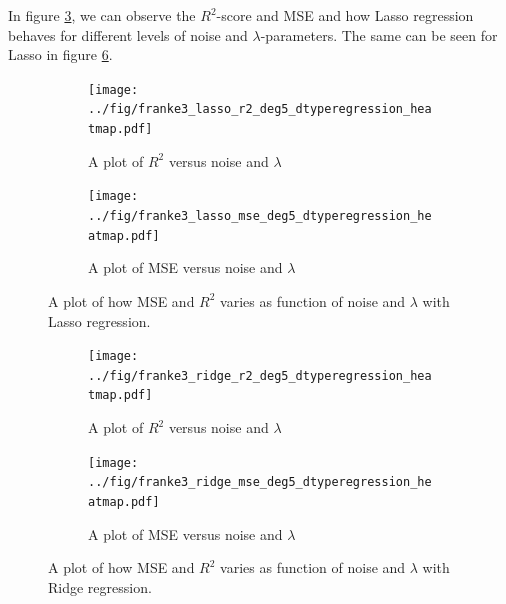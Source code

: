 \documentclass[11pt]{article}
\begin{document}
In figure \ref{fig:mse_r2_heatmaps_ff_lasso}, we can observe the $R^2$-score and MSE and how Lasso regression behaves for different levels of noise and $\lambda$-parameters. The same can be seen for Lasso in figure \ref{fig:mse_r2_heatmaps_ff_ridge}.
\begin{figure}
    \centering
    \begin{subfigure}[b]{0.5\textwidth}
        \centering
        \texttt{[image: ../fig/franke3\_lasso\_r2\_deg5\_dtyperegression\_heatmap.pdf]}
        \caption{A plot of $R^2$ versus noise and $\lambda$}
        \label{fig:franke_heatmat_r2}
    \end{subfigure}%
    \begin{subfigure}[b]{0.5\textwidth}
        \centering
        \texttt{[image: ../fig/franke3\_lasso\_mse\_deg5\_dtyperegression\_heatmap.pdf]}
        \caption{A plot of MSE versus noise and $\lambda$}
        \label{fig:franke_heatmat_mse}
    \end{subfigure}
    \caption{A plot of how MSE and $R^2$ varies as function of noise and $\lambda$ with Lasso regression.}
    \label{fig:mse_r2_heatmaps_ff_lasso}
\end{figure}

\begin{figure}
    \centering
    \begin{subfigure}[b]{0.5\textwidth}
        \centering
        \texttt{[image: ../fig/franke3\_ridge\_r2\_deg5\_dtyperegression\_heatmap.pdf]}
        \caption{A plot of $R^2$ versus noise and $\lambda$}
        \label{fig:franke_heatmat_r2_ridge}
    \end{subfigure}%
    \begin{subfigure}[b]{0.5\textwidth}
        \centering
        \texttt{[image: ../fig/franke3\_ridge\_mse\_deg5\_dtyperegression\_heatmap.pdf]}
        \caption{A plot of MSE versus noise and $\lambda$}
        \label{fig:franke_heatmat_mse_ridge}
    \end{subfigure}
    \caption{A plot of how MSE and $R^2$ varies as function of noise and $\lambda$ with Ridge regression.}
    \label{fig:mse_r2_heatmaps_ff_ridge}
\end{figure}

\end{document}
